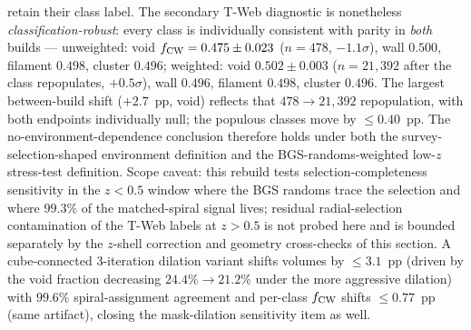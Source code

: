 \documentclass[aps,prd,twocolumn,superscriptaddress,showpacs,preprintnumbers,nofootinbib,longbibliography,floatfix]{revtex4-2}
\begin{document}
retain their class label. The secondary T-Web diagnostic is nonetheless
\emph{classification-robust}: every class is individually consistent
with parity in \emph{both} builds --- unweighted: void
$f_{\rm CW} = 0.475 \pm 0.023$ ($n=478$, $-1.1\sigma$), wall $0.500$,
filament $0.498$, cluster $0.496$; weighted: void $0.502 \pm 0.003$
($n = 21{,}392$ after the class repopulates, $+0.5\sigma$), wall
$0.496$, filament $0.498$, cluster $0.496$. The largest between-build
shift ($+2.7$~pp, void) reflects that $478 \to 21{,}392$ repopulation,
with both endpoints individually null; the populous classes move by
$\le 0.40$~pp. The no-environment-dependence conclusion therefore holds
under both the survey-selection-shaped environment definition and the
BGS-randoms-weighted low-$z$ stress-test definition. Scope caveat: this rebuild tests
selection-completeness sensitivity in the $z<0.5$ window where the BGS
randoms trace the selection and where $99.3\%$ of the matched-spiral
signal lives; residual radial-selection contamination of the T-Web
labels at $z>0.5$ is not probed here and is bounded separately by the
$z$-shell correction and geometry cross-checks of this section. A
cube-connected 3-iteration dilation variant shifts volumes by
$\le 3.1$~pp (driven by the void fraction decreasing
$24.4\% \to 21.2\%$ under the more aggressive dilation) with $99.6\%$
spiral-assignment agreement and per-class $f_{\rm CW}$ shifts
$\le 0.77$~pp (same artifact), closing the mask-dilation sensitivity
item as well.
\end{document}
